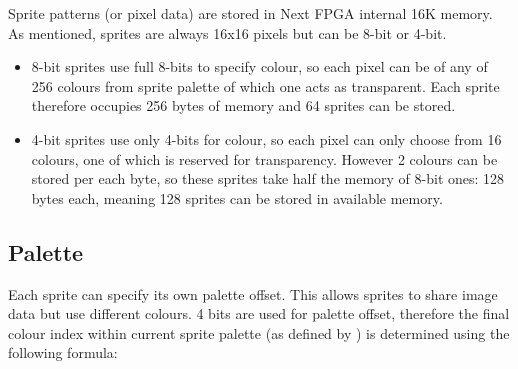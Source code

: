 \documentclass[12pt,twoside,openright,a4paper]{book}
\begin{document}
Sprite patterns (or pixel data) are stored in Next FPGA internal 16K memory. As mentioned, sprites are always 16x16 pixels but can be 8-bit or 4-bit.

\begin{itemize}[topsep=1pt,itemsep=1pt]
	\item 8-bit sprites use full 8-bits to specify colour, so each pixel can be of any of 256 colours from sprite palette of which one acts as transparent. Each sprite therefore occupies 256 bytes of memory and 64 sprites can be stored.

	\item 4-bit sprites use only 4-bits for colour, so each pixel can only choose from 16 colours, one of which is reserved for transparency. However 2 colours can be stored per each byte, so these sprites take half the memory of 8-bit ones: 128 bytes each, meaning 128 sprites can be stored in available memory.
\end{itemize}


\subsection{Palette}

Each sprite can specify its own palette offset. This allows sprites to share image data but use different colours. 4 bits are used for palette offset, therefore the final colour index within current sprite palette (as defined by ) is determined using the following formula:
\end{document}
